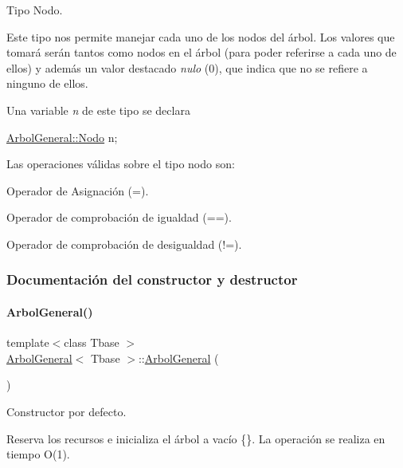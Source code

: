 Tipo Nodo. 

Este tipo nos permite manejar cada uno de los nodos del árbol. Los valores que tomará serán tantos como nodos en el árbol (para poder referirse a cada uno de ellos) y además un valor destacado {\itshape nulo} (0), que indica que no se refiere a ninguno de ellos.

Una variable {\itshape n} de este tipo se declara

{\ttfamily \hyperlink{classArbolGeneral_a12cc1b74a9095d89bc7334290d332f7a}{Arbol\+General\+::\+Nodo} n;}

Las operaciones válidas sobre el tipo nodo son\+:


\begin{DoxyItemize}
\item Operador de Asignación (=).
\item Operador de comprobación de igualdad (==).
\item Operador de comprobación de desigualdad (!=). 
\end{DoxyItemize}

\subsubsection{Documentación del constructor y destructor}
\hypertarget{classArbolGeneral_a2c792965befd8644246118a09a10123c}{}\label{classArbolGeneral_a2c792965befd8644246118a09a10123c} 
\paragraph{\texorpdfstring{Arbol\+General()}{ArbolGeneral()}\hspace{0.1cm}{\footnotesize\ttfamily [1/3]}}
{\footnotesize\ttfamily template$<$class Tbase $>$ \\
\hyperlink{classArbolGeneral}{Arbol\+General}$<$ Tbase $>$\+::\hyperlink{classArbolGeneral}{Arbol\+General} (\begin{DoxyParamCaption}{ }\end{DoxyParamCaption})}



Constructor por defecto. 

Reserva los recursos e inicializa el árbol a vacío \{\}. La operación se realiza en tiempo O(1). \hypertarget{classArbolGeneral_a8ddac1a024f05bee96f4c259fad76c4c}{}\label{classArbolGeneral_a8ddac1a024f05bee96f4c259fad76c4c} 
